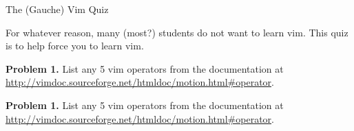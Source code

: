 \documentclass{article}
\begin{document}
\begin{center}
\Large The (Gauche) Vim Quiz
\end{center}

\noindent
For whatever reason, many (most?) students do not want to learn vim.
This quiz is to help force you to learn vim.

\vspace{0.2in}
\noindent
\textbf{Problem 1.}
List any 5 vim operators from the documentation at \url{http://vimdoc.sourceforge.net/htmldoc/motion.html#operator}.

\vspace{0.2in}
\noindent
\textbf{Problem 1.}
List any 5 vim operators from the documentation at \url{http://vimdoc.sourceforge.net/htmldoc/motion.html#operator}.

%
\end{document}
